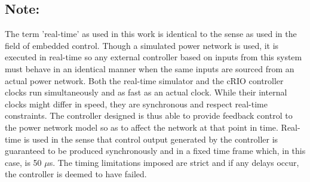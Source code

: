 \documentclass[conference]{IEEEtran}
\begin{document}

\subsection*{Note:}
The term 'real-time' as used in this work is identical to the sense as used in the field of embedded control\cite{Real-Time}. Though a simulated power network is used, it is executed in real-time so any external controller based on inputs from this system must behave in an identical manner when the same inputs are sourced from an actual power network. Both the real-time simulator and the cRIO controller clocks run simultaneously and as fast as an actual clock. While their internal clocks might differ in speed, they are synchronous and respect real-time constraints. The controller designed is thus able to provide feedback control to the power network model so as to affect the network at that point in time. Real-time is used in the sense that control output generated by the controller is guaranteed to be produced synchronously and in a fixed time frame which, in this case, is 50 $\mu$s. The timing limitations imposed are strict and if any delays occur, the controller is deemed to have failed. 



\end{document}
